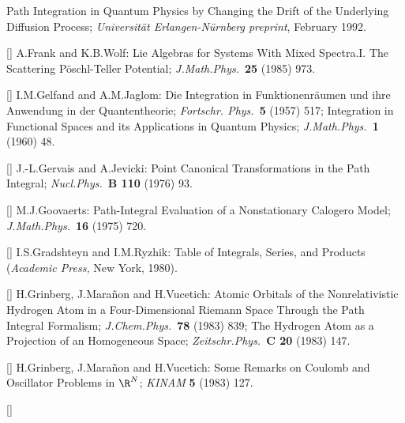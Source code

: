 \newline
Path Integration in Quantum Physics by Changing the Drift of the
Underlying Diffusion Process;
{\it Universit\"at Erlangen-N\"urnberg preprint}, February 1992.
\item{[\FW]}
A.Frank and K.B.Wolf:
Lie Algebras for Systems With Mixed Spectra.I.
The Scattering P\"oschl-Teller Potential;
{\it J.Math.Phys.}\ {\bf 25} (1985) 973.
\item{[\GY]}
I.M.Gelfand and A.M.Jaglom:
Die Integration in Funktionenr\"aumen und ihre Anwendung in der
Quantentheorie;
{\it Fortschr. Phys.}\ {\bf 5} (1957) 517;
Integration in Functional Spaces and its Applications in Quantum
Physics;
{\it J.Math.Phys.}\ {\bf 1} (1960) 48.
\item{[\GJ]}
J.-L.Gervais and A.Jevicki:
Point Canonical Transformations in the Path Integral;
{\it Nucl.Phys.}\ {\bf B 110} (1976) 93.
\item{[\GOOb]}
M.J.Goovaerts:
Path-Integral Evaluation of a Nonstationary Calogero Model;
{\it J.Math.Phys.}\ {\bf 16} (1975) 720.
\item{[\GRA]}
I.S.Gradshteyn and I.M.Ryzhik:
Table of Integrals, Series, and Products
({\it Academic Press,} New York, 1980).
\item{[\GMV]}
H.Grinberg, J.Mara\~non and H.Vucetich:
Atomic Orbitals of the Nonrelativistic Hydrogen Atom in a
Four-Dimensional Riemann Space Through the Path Integral Formalism;
{\it J.Chem.Phys.}\ {\bf 78} (1983) 839;
\newline
The Hydrogen Atom as a Projection of an Homogeneous Space;
{\it Zeitschr.Phys.}\ {\bf C 20} (1983) 147.
\item{[\GMVc]}
H.Grinberg, J.Mara\~non and H.Vucetich:
Some Remarks on Coulomb and Oscillator Problems in $\R^N$;
{\it KINAM} {\bf 5} (1983) 127.
\item{[\GROa]}
